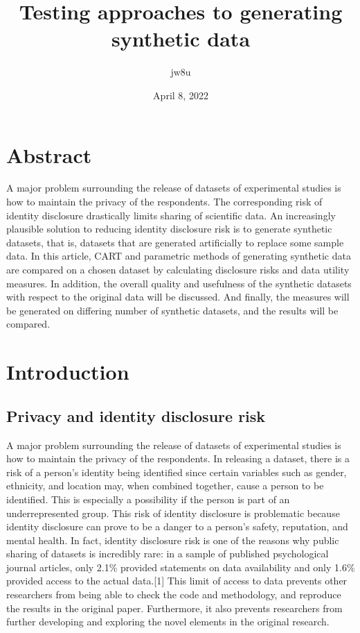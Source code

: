 \documentclass[12pt]{article}
\begin{document}
	
\title{Testing approaches to generating synthetic data}
\author{jw8u}
\date{April 8, 2022}
	
\begin{titlepage}
	\maketitle
\end{titlepage}

\setcounter{page}{2}

\section*{Abstract}
A major problem surrounding the release of datasets of experimental studies is how to maintain the privacy of the respondents. The corresponding risk of identity disclosure drastically limits sharing of scientific data. An increasingly plausible solution to reducing identity disclosure risk is to generate synthetic datasets, that is, datasets that are generated artificially to replace some sample data. In this article, CART and parametric methods of generating synthetic data are compared on a chosen dataset by calculating disclosure risks and data utility measures. In addition, the overall quality and usefulness of the synthetic datasets with respect to the original data will be discussed. And finally, the measures will be generated on differing number of synthetic datasets, and the results will be compared. 
\newpage

\section*{Introduction}

\subsection*{Privacy and identity disclosure risk}
A major problem surrounding the release of datasets of experimental studies is how to maintain the privacy of the respondents. In releasing a dataset, there is a risk of a person’s identity being identified since certain variables such as gender, ethnicity, and location may, when combined together, cause a person to be identified. This is especially a possibility if the person is part of an underrepresented group. This risk of identity disclosure is problematic because identity disclosure can prove to be a danger to a person's safety, reputation, and mental health. In fact, identity disclosure risk is one of the reasons why public sharing of datasets is incredibly rare: in a sample of published psychological journal articles, only 2.1\% provided statements on data availability and only 1.6\% provided access to the actual data.[1] This limit of access to data prevents other researchers from being able to check the code and methodology, and reproduce the results in the original paper. Furthermore, it also prevents researchers from further developing and exploring the novel elements in the original research. 
\end{document}
